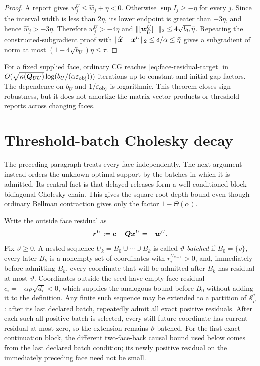 \begin{proof}
A report gives
$w_j^U\leq\widehat w_j+\bar\eta<0$.  Otherwise
$\sup I_j\geq-\bar\eta$ for every $j$.  Since the interval width is less than
$2\bar\eta$, its lower endpoint is greater than $-3\bar\eta$, and hence
$\widehat w_j>-3\bar\eta$.  Therefore
$w_j^U>-4\bar\eta$ and
$\lVert[\bm{w}^U_{\bar U}]_-\rVert_2\leq4\sqrt{b_U}\bar\eta$.  Repeating the
constructed-subgradient proof with
$\lVert\widehat{\bm{x}}-\bm{x}^U\rVert_2\leq\delta/\alpha\leq\bar\eta$ gives a
subgradient of norm at most
$(1+4\sqrt{b_U})\bar\eta\leq\tau$.
\end{proof}

For a fixed supplied face, ordinary CG reaches
\cref{eq:face-residual-target} in
$O(\sqrt{\kappa(\bm{Q}_{UU})}\log(b_U/(\alpha\varepsilon_{\mathrm{obj}})))$ iterations up to
constant and initial-gap factors.  The dependence on $b_U$ and
$1/\varepsilon_{\mathrm{obj}}$ is logarithmic.  This theorem closes sign robustness, but it does
not amortize the matrix-vector products or threshold reports across changing
faces.

\section{Threshold-batch Cholesky decay}
\label{sec:batch-depth}

The preceding paragraph treats every face independently.  The next argument
instead orders the unknown optimal support by the batches in which it is
admitted.  Its central fact is that delayed releases form a well-conditioned
block-bidiagonal Cholesky chain.  This gives the square-root depth bound even
though ordinary Bellman contraction gives only the factor $1-\Theta(\alpha)$.

Write the outside face residual as
\begin{equation}
 \bm{r}^U:=\bm{c}-\bm{Q}\bm{x}^U=-\bm{w}^U.
 \label{eq:outside-face-residual}
\end{equation}
Fix $\vartheta\geq0$.  A nested sequence
$U_k=B_0\mathbin{\dot\cup}\cdots\mathbin{\dot\cup}B_k$ is called
\emph{$\vartheta$-batched} if $B_0=\{v\}$, every later $B_k$ is a nonempty
set of coordinates with $r_i^{U_{k-1}}>0$, and, immediately before admitting
$B_k$, every coordinate that will be admitted after $B_k$ has residual at
most $\vartheta$.  Coordinates outside the seed have empty-face residual
$c_i=-\alpha\rho\sqrt{d_i}<0$, which supplies the analogous bound before
$B_0$ without adding it to the definition.  Any finite such sequence may be
extended to a partition of $\mathcal S_\rho^*$: after its last declared batch,
repeatedly admit all exact positive residuals.  After each such all-positive
batch is selected, every still-future coordinate has current residual at most
zero, so the extension remains $\vartheta$-batched.  For the first exact
continuation block, the different two-face-back causal bound used below comes
from the last declared batch condition; its newly positive residual on the
immediately preceding face need not be small.

